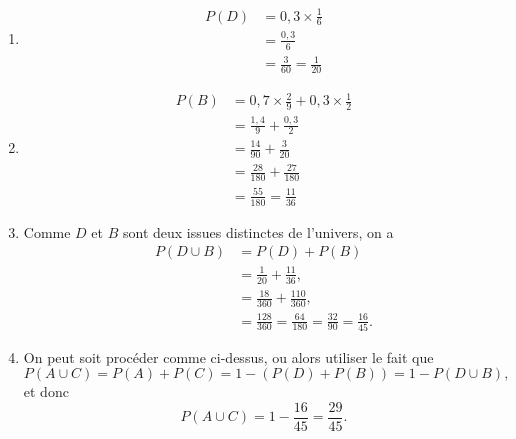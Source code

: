 {\begin{center}
	\end{center}
	
	\begin{enumerate}
		\item 
			\begin{align*}
				P(D) &= 0,3 \times \frac16 \\ &= \frac{0,3}{6} \\ &= \frac{3}{60} = \frac1{20}
			\end{align*}
		\item 
			\begin{align*}
				P(B) &= 0,7 \times \frac29 + 0,3 \times \frac12 \\
					&= \frac{1,4}9 + \frac{0,3}2 \\
					&= \frac{14}{90} + \frac3{20} \\
					&= \frac{28}{180} + \frac{27}{180} \\
					&= \frac{55}{180} = \frac{11}{36}
			\end{align*}
		\item 
			Comme $D$ et $B$ sont deux issues distinctes de l'univers, on a
			\begin{align*}
				P(D \cup B) &= P(D) + P(B) \\ &= \frac1{20} + \frac{11}{36}, \\
				&= \frac{18}{360} + \frac{110}{360}, \\
				&= \frac{128}{360} = \frac{64}{180} = \frac{32}{90} = \frac{16}{45}.
			\end{align*}
		\item On peut soit procéder comme ci-dessus, ou alors utiliser le fait que
			\[ P(A\cup C) = P(A) + P(C) = 1 - \left( P(D) + P(B) \right) = 1 - P(D \cup B), \]
		et donc
			\[ P(A\cup C) = 1 - \frac{16}{45} = \frac{29}{45}. \]
	\end{enumerate}
}

